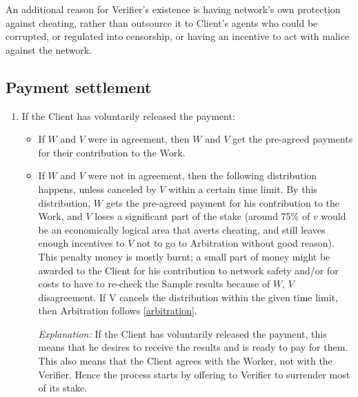 \documentclass[conference]{IEEEtran}
\begin{document}
An additional reason for Verifier's existence is having network's own protection against cheating, rather than outsource it to Client's agents who could be corrupted, or regulated into censorship, or having an incentive to act with malice against the network.

\subsection{Payment settlement}
\label{settlement}

\renewcommand{\labelenumi}{\arabic{enumi}.}
\begin{enumerate}
    \item If the Client has voluntarily released the payment:
        \begin{itemize}
            \item If $W$ and $V$ were in agreement, then $W$ and $V$ get the pre-agreed payments for their contribution to the Work.
            
            \item  If $W$ and $V$ were not in agreement, then the following distribution happens, unless canceled by $V$ within a certain time limit. By this distribution, $W$ gets the pre-agreed payment for his contribution to the Work, and $V$ loses a significant part of the stake (around 75\% of $v$ would be an economically logical area that averts cheating, and still leaves enough incentives to $V$ not to go to Arbitration without good reason). This penalty money is mostly burnt; a small part of money might be awarded to the Client for his contribution to network safety and/or for costs to have to re-check the Sample results because of $W$, $V$ disagreement. If V cancels the distribution within the given time limit, then Arbitration follows \ref{arbitration}.
            
            \textit{Explanation:} If the Client has voluntarily released the payment, this means that he desires to receive the results and is ready to pay for them. This also means that the Client agrees with the Worker, not with the Verifier. Hence the process starts by offering to Verifier to surrender most of its stake.
        \end{itemize}
        

\end{enumerate}
\end{document}
